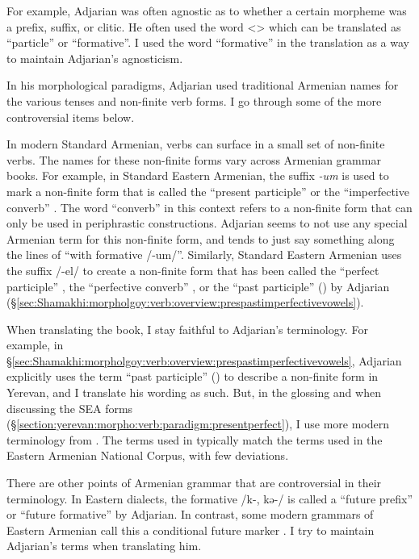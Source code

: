 \documentclass[output=paper]{langscibook}
\begin{document}
For example, Adjarian was often agnostic as to whether a certain morpheme was a prefix, suffix, or clitic. He often used the word <> which can be translated as ``particle'' or ``formative''. I used the word ``formative'' in the translation as a way to maintain Adjarian's agnosticism.

In his morphological paradigms, Adjarian used traditional Armenian names for the various tenses and non-finite verb forms. I go through some of the more controversial items below. 

In modern Standard Armenian, verbs can surface in a small set of non-finite verbs. The names for these non-finite forms vary across Armenian grammar books. For example, in Standard Eastern Armenian, the suffix \textit{-um} is used to mark a non-finite form that is called the ``present participle'' \citep[212]{DumTragut-2009-ArmenianReferenceGrammar} or the ``imperfective converb'' \citep[109]{DolatianEtAl-prep-IranianGrammar}. The word ``converb'' in this context refers to a non-finite form that can only be used in periphrastic constructions. Adjarian seems to not use any special Armenian term for this non-finite form, and tends to just say something along the lines of ``with formative /-um/''.  Similarly, Standard Eastern Armenian uses the suffix /-el/ to create a non-finite form  that has been called the ``perfect participle'' \citep[213]{DumTragut-2009-ArmenianReferenceGrammar}, the ``perfective converb'' \citep[111]{DolatianEtAl-prep-IranianGrammar}, or the ``past participle'' ()  by Adjarian (\S\ref{sec:Shamakhi:morpholgoy:verb:overview:prespastimperfectivevowels}).

When translating the book, I stay faithful to Adjarian's terminology.  For example, in \S\ref{sec:Shamakhi:morpholgoy:verb:overview:prespastimperfectivevowels}, Adjarian explicitly uses the term ``past participle'' ()  to describe a non-finite form in Yerevan, and I translate his wording as such. But, in the glossing and when discussing the SEA forms (\S\ref{section:yerevan:morpho:verb:paradigm:presentperfect}), I use more modern terminology from \citet{DolatianEtAl-prep-IranianGrammar}. The terms used in \citet{DolatianEtAl-prep-IranianGrammar} typically match the terms used in the Eastern Armenian National Corpus, with few deviations.

There are other points of Armenian grammar that are controversial in their terminology. In Eastern dialects, the formative /k-, kə-/ is called a ``future prefix'' or ``future formative'' by Adjarian. In contrast, some modern grammars of Eastern Armenian  call this a conditional future marker \citep[253ff]{DumTragut-2009-ArmenianReferenceGrammar}. I try to maintain Adjarian's terms when translating him.
\end{document}
